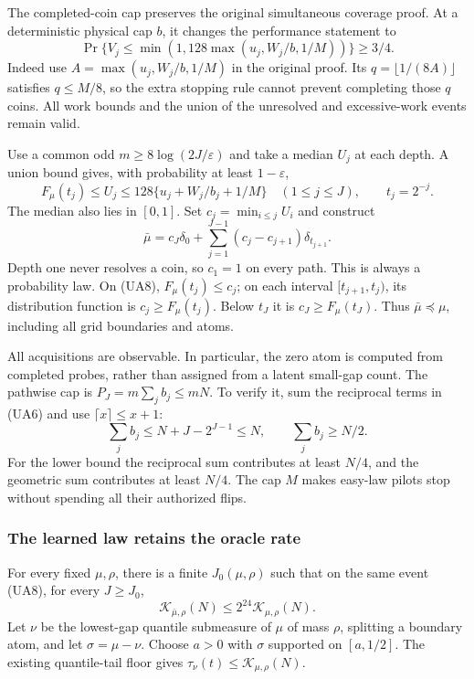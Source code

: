 The completed-coin cap preserves the original simultaneous coverage proof.
At a deterministic physical cap $b$, it changes the performance statement to
\[
 \Pr\{V_j\le\min(1,128\max(u_j,W_j/b,1/M))\}\ge3/4.    \tag{UA7}
\]
Indeed use $A=\max(u_j,W_j/b,1/M)$ in the original proof. Its
$q=\lfloor1/(8A)\rfloor$ satisfies $q\le M/8$, so the extra stopping rule
cannot prevent completing those $q$ coins. All work bounds and the union of
the unresolved and excessive-work events remain valid.

Use a common odd $m\ge8\log(2J/\varepsilon)$ and take a median $U_j$ at each
depth. A union bound gives, with probability at least $1-\varepsilon$,
\[
 F_\mu(t_j)\le U_j\le
 128\{u_j+W_j/b_j+1/M\}\quad(1\le j\le J),
 \qquad t_j=2^{-j}.                                    \tag{UA8}
\]
The median also lies in $[0,1]$. Set $c_j=\min_{i\le j}U_i$ and construct
\[
 \bar\mu=c_J\delta_0+
       \sum_{j=1}^{J-1}(c_j-c_{j+1})\delta_{t_{j+1}}.    \tag{UA9}
\]
Depth one never resolves a coin, so $c_1=1$ on every path. This is always a
probability law. On (UA8), $F_\mu(t_j)\le c_j$; on each interval
$[t_{j+1},t_j)$, its distribution function is $c_j\ge F_\mu(t_j)$.
Below $t_J$ it is $c_J\ge F_\mu(t_J)$. Thus $\bar\mu\preceq\mu$, including
all grid boundaries and atoms.

All acquisitions are observable. In particular, the zero atom is computed
from completed probes, rather than assigned from a latent small-gap count.
The pathwise cap is $P_J=m\sum_j b_j\le mN$. To verify it, sum the reciprocal
terms in (UA6) and use $\lceil x\rceil\le x+1$:
\[
 \sum_j b_j\le N+J-2^{J-1}\le N,
 \qquad \sum_j b_j\ge N/2.                             \tag{UA10}
\]
For the lower bound the reciprocal sum contributes at least $N/4$, and
the geometric sum contributes at least $N/4$. The cap $M$ makes easy-law
pilots stop without spending all their authorized flips.

\subsubsection{The learned law retains the oracle rate}

For every fixed $\mu,\rho$, there is a finite $J_0(\mu,\rho)$ such that on
the same event (UA8), for every $J\ge J_0$,
\[
 \mathcal K_{\bar\mu,\rho}(N)\le2^{24}\mathcal K_{\mu,\rho}(N).           \tag{UA11}
\]
Let $\nu$ be the lowest-gap quantile submeasure of $\mu$ of mass $\rho$,
splitting a boundary atom, and let $\sigma=\mu-\nu$. Choose $a>0$ with
$\sigma$ supported on $[a,1/2]$. The existing quantile-tail floor gives
$\tau_\nu(t)\le \mathcal K_{\mu,\rho}(N)$.

